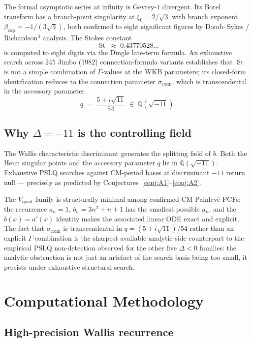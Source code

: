 \documentclass[11pt,reqno]{amsart}
\theoremstyle{definition}
\DeclareMathOperator{\Stokes}{St}
\begin{document}
The formal asymptotic series at infinity is Gevrey-$1$
divergent. Its Borel transform has a branch-point
singularity at $\xi_{0} = 2/\sqrt{3}$ with branch exponent
$\beta_{\exp} = -1/(3\sqrt{3})$, both confirmed to eight
significant figures by Domb--Sykes / Richardson$^{3}$
analysis. The Stokes constant
\[
\Stokes \;\approx\; 0.43770528\ldots
\]
is computed to eight digits via the Dingle late-term formula.
An exhaustive search across $245$ Jimbo (1982) connection-formula
variants establishes that $\Stokes$ is not a simple combination
of $\Gamma$-values at the WKB parameters; its closed-form
identification reduces to the connection parameter
$\sigma_{\mathrm{conn}}$, which is transcendental in the
accessory parameter
\[
q \;=\; \frac{5+i\sqrt{11}}{54} \;\in\; \mathbb{Q}(\sqrt{-11}).
\]

\subsection{Why $\Delta=-11$ is the controlling field}

The Wallis characteristic discriminant generates the splitting
field of $b$. Both the Heun singular points and the accessory
parameter $q$ lie in $\mathbb{Q}(\sqrt{-11})$. Exhaustive
PSLQ searches against CM-period bases at discriminant $-11$
return null --- precisely as predicted by
Conjectures~\ref{conj:A1}--\ref{conj:A2}.

The $V_{\mathrm{quad}}$ family is structurally minimal among
confirmed CM Painlev\'e PCFs: the recurrence
$a_{n}=1$, $b_{n}=3n^{2}+n+1$ has the smallest possible
$a_{n}$, and the $b(x) = a'(x)$ identity makes the associated
linear ODE exact and explicit. The fact that
$\sigma_{\mathrm{conn}}$ is transcendental in
$q=(5+i\sqrt{11})/54$ rather than an explicit $\Gamma$-combination
is the sharpest available analytic-side counterpart to the
empirical PSLQ non-detection observed for the other five
$\Delta<0$ families: the analytic obstruction is not just an
artefact of the search basis being too small, it persists
under exhaustive structural search.

\section{Computational Methodology}\label{sec:methodology}

\subsection{High-precision Wallis recurrence}\label{ssec:wallis-impl}
\end{document}
